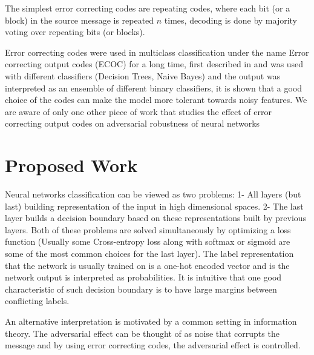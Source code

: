 \documentclass{article}
\begin{document}
The simplest error correcting codes are repeating codes, where each bit (or a block) in the source message is repeated $n$ times, decoding is done by majority voting over repeating bits (or blocks). 

Error correcting codes were used in multiclass classification under the name Error correcting output codes (ECOC) for a long time, first described in \cite{dietterich1994solving} and was used with different classifiers (Decision Trees, Naive Bayes) and the output was interpreted as an ensemble of different binary classifiers, it is shown that a good choice of the codes can make the model more tolerant towards noisy features. We are aware of only one other piece of work that studies the effect of error correcting output codes on adversarial robustness of neural networks

\section{Proposed Work}
Neural networks classification can be viewed as two problems: 1- All layers (but last) building representation of the input in high dimensional spaces. 2- The last layer builds a decision boundary based on these representations built by previous layers. Both of these problems are solved simultaneously by optimizing a loss function (Usually some Cross-entropy loss along with softmax or sigmoid are some of the most common choices for the last layer). The label representation that the network is usually trained on is a one-hot encoded vector and is the network output is interpreted as probabilities. It is intuitive that one good characteristic of such decision boundary is to have large margins between conflicting labels. 

An alternative interpretation is motivated by a common setting in information theory. The adversarial effect can be thought of as noise that corrupts the message and by using error correcting codes, the adversarial effect is controlled.

\end{document}
